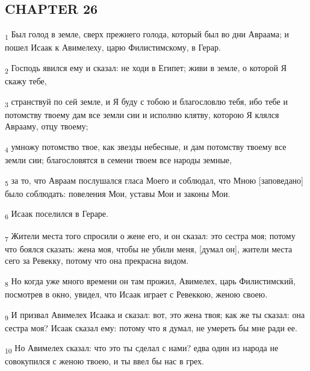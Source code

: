 \subsection{CHAPTER 26}
\begin{tcolorbox}
\textsubscript{1} Был голод в земле, сверх прежнего голода, который был во дни Авраама; и пошел Исаак к Авимелеху, царю Филистимскому, в Герар.
\end{tcolorbox}
\begin{tcolorbox}
\textsubscript{2} Господь явился ему и сказал: не ходи в Египет; живи в земле, о которой Я скажу тебе,
\end{tcolorbox}
\begin{tcolorbox}
\textsubscript{3} странствуй по сей земле, и Я буду с тобою и благословлю тебя, ибо тебе и потомству твоему дам все земли сии и исполню клятву, которою Я клялся Аврааму, отцу твоему;
\end{tcolorbox}
\begin{tcolorbox}
\textsubscript{4} умножу потомство твое, как звезды небесные, и дам потомству твоему все земли сии; благословятся в семени твоем все народы земные,
\end{tcolorbox}
\begin{tcolorbox}
\textsubscript{5} за то, что Авраам послушался гласа Моего и соблюдал, что Мною [заповедано] было соблюдать: повеления Мои, уставы Мои и законы Мои.
\end{tcolorbox}
\begin{tcolorbox}
\textsubscript{6} Исаак поселился в Гераре.
\end{tcolorbox}
\begin{tcolorbox}
\textsubscript{7} Жители места того спросили о жене его, и он сказал: это сестра моя; потому что боялся сказать: жена моя, чтобы не убили меня, [думал он], жители места сего за Ревекку, потому что она прекрасна видом.
\end{tcolorbox}
\begin{tcolorbox}
\textsubscript{8} Но когда уже много времени он там прожил, Авимелех, царь Филистимский, посмотрев в окно, увидел, что Исаак играет с Ревеккою, женою своею.
\end{tcolorbox}
\begin{tcolorbox}
\textsubscript{9} И призвал Авимелех Исаака и сказал: вот, это жена твоя; как же ты сказал: она сестра моя? Исаак сказал ему: потому что я думал, не умереть бы мне ради ее.
\end{tcolorbox}
\begin{tcolorbox}
\textsubscript{10} Но Авимелех сказал: что это ты сделал с нами? едва один из народа не совокупился с женою твоею, и ты ввел бы нас в грех.
\end{tcolorbox}
